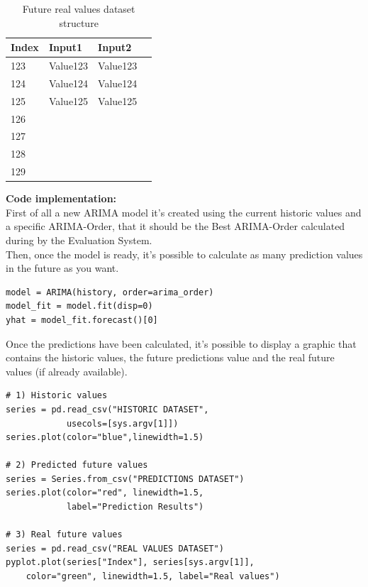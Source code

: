 \begin{table}[ht] 
    \centering 
    \begin{tabular}{ | l | l | l | p{5cm} |}
        \hline
        Index & Input1 & Input2 		\\ \hline
          	123 & Value123 & Value123 	\\ \hline
          	124 & Value124 & Value124 	\\ \hline
          	125 & Value125 & Value125 	\\ \hline
          	126 & 	&					\\ \hline
          	127 & 	&					\\ \hline
          	128 & 	&					\\ \hline
 			129 & 	&					\\ \hline
    \end{tabular}
    \caption{Future real values dataset structure}
    \label{table: pred_real_values} 
\end{table} 

\newpage
\textbf{Code implementation:}\\
First of all a new ARIMA model it's created using the current historic values and a specific ARIMA-Order, that it should be the Best ARIMA-Order calculated during by the Evaluation System.\\
Then, once the model is ready, it's possible to calculate as many prediction values in the future as you want. \\
\begin{lstlisting}
model = ARIMA(history, order=arima_order)
model_fit = model.fit(disp=0)
yhat = model_fit.forecast()[0]
\end{lstlisting}

Once the predictions have been calculated, it's possible to display a graphic that contains the historic values, the future predictions value and the real future values (if already available).
\begin{lstlisting}
# 1) Historic values
series = pd.read_csv("HISTORIC DATASET", 
			usecols=[sys.argv[1]])
series.plot(color="blue",linewidth=1.5)

# 2) Predicted future values
series = Series.from_csv("PREDICTIONS DATASET")
series.plot(color="red", linewidth=1.5, 
			label="Prediction Results")

# 3) Real future values
series = pd.read_csv("REAL VALUES DATASET")
pyplot.plot(series["Index"], series[sys.argv[1]],
	color="green", linewidth=1.5, label="Real values")

\end{lstlisting}

